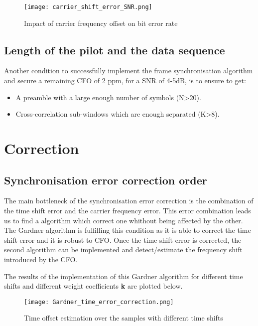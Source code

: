 \begin{figure}[H]
    \centering
    \texttt{[image: carrier\_shift\_error\_SNR.png]}
    \caption{Impact of carrier frequency offset on bit error rate}
    \label{fig:carrier_shift_error_SNR}
\end{figure}

\subsection{Length of the pilot and the data sequence}

Another condition to successfully implement the frame synchronisation algorithm and secure a remaining 
CFO of 2 ppm, for a SNR of 4-5dB, is to ensure to get:
\begin{itemize}
    \item A preamble with a large enough number of symbols (N>20).
    \item Cross-correlation sub-windows which are enough separated (K>8).  
\end{itemize}

\section{Correction}

\subsection{Synchronisation error correction order}

The main bottleneck of the synchronisation error correction is the combination of the time shift error and
 the carrier frequency error.
This error combination leads us to find a algorithm which correct one whithout being affected by the other.
The Gardner algorithm is fulfilling this condition as it is able to correct the time shift error and it is robust to CFO.
Once the time shift error is corrected, the second algorithm can be implemented and detect/estimate the frequency shift introduced by the CFO.\newline

The results of the implementation of this Gardner algorithm for different time shifts and different weight coefficients \textbf{k} are plotted below.

\begin{figure}[H]
    \centering
    \texttt{[image: Gardner\_time\_error\_correction.png]}
    \caption{Time offset estimation over the samples with different time shifts}
    \label{fig:Gardner_time_error_correction}
\end{figure}

